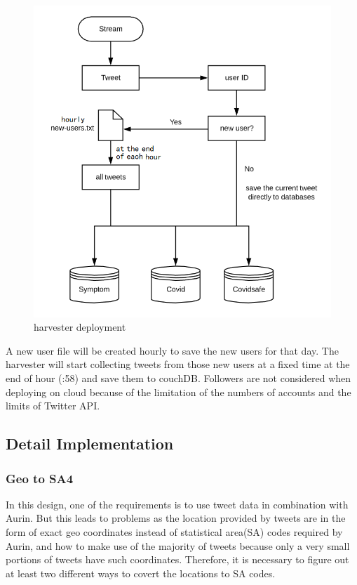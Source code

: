 \begin{figure}[H]
\centering
\includegraphics[scale=0.4]{city_analytics/report/images/deployment.png}
\caption{harvester deployment}
\label{fig:harvester deployment}
\end{figure}

A new user file will be created hourly to save the new users for that day. The harvester will start collecting tweets from those new users at a fixed time at the end of hour (:58) and save them to couchDB. Followers are not considered when deploying on cloud because of the limitation of the numbers of accounts and the limits of Twitter API.

\subsection{Detail Implementation}

\subsubsection{Geo to SA4}
In this design, one of the requirements is to use tweet data in combination with Aurin. But this leads to problems as the location provided by tweets are in the form of exact geo coordinates instead of statistical area(SA) codes required by Aurin, and how to make use of the majority of tweets because only a very small portions of tweets have such coordinates. Therefore, it is necessary to figure out at least two different ways to covert the locations to SA codes.


